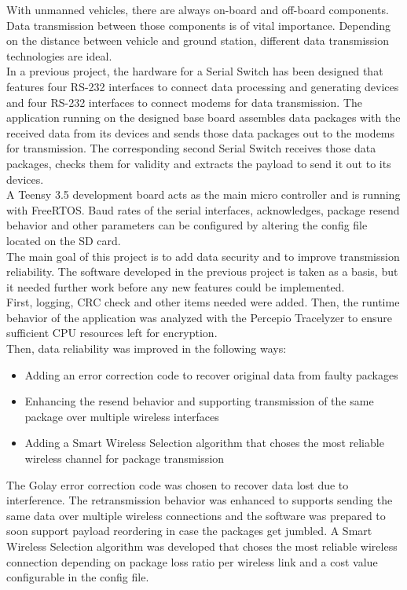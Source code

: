 %
With unmanned vehicles, there are always on-board and off-board components. Data transmission between those components is of vital importance. Depending on the distance between vehicle and ground station, different data transmission technologies are ideal. \\
In a previous project, the hardware for a Serial Switch has been designed that features four RS-232 interfaces to connect data processing and generating devices and four RS-232 interfaces to connect modems for data transmission. The application running on the designed base board assembles data packages with the received data from its devices and sends those data packages out to the modems for transmission. The corresponding second Serial Switch receives those data packages, checks them for validity and extracts the payload to send it out to its devices.\\
A Teensy 3.5 development board acts as the main micro controller and is running with FreeRTOS. Baud rates of the serial interfaces, acknowledges, package resend behavior and other parameters can be configured by altering the config file located on the SD card.\\
The main goal of this project is to add data security and to improve transmission reliability. The software developed in the previous project is taken as a basis, but it needed further work before any new features could be implemented. \\
First, logging, CRC check and other items needed were added. Then, the runtime behavior of the application was analyzed with the Percepio Tracelyzer to ensure sufficient CPU resources left for encryption.\\
Then, data reliability was improved in the following ways:\begin{itemize}
    \item Adding an error correction code to recover original data from faulty packages
    \item Enhancing the resend behavior and supporting transmission of the same package over multiple wireless interfaces
    \item Adding a Smart Wireless Selection algorithm that choses the most reliable wireless channel for package transmission
\end{itemize}
The Golay error correction code was chosen to recover data lost due to interference. The retransmission behavior was enhanced to supports sending the same data over multiple wireless connections and the software was prepared to soon support payload reordering in case the packages get jumbled. A Smart Wireless Selection algorithm was developed that choses the most reliable wireless connection depending on package loss ratio per wireless link and a cost value configurable in the config file.\\
